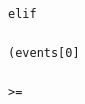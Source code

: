 \documentclass[10pt,a4paper]{article} %
\begin{document}
\begin{lstlisting}
                                                                                                                                                                                                                                                                                                                                                                                                                                                                                                                                                                                                                                                                                                                                                                                                                                                                                                                                                                                                                                                                                                    elif
                                                                                                                                                                                                                                                                                                                                                                                                                                                                                                                                                                                                                                                                                                                                                                                                                                                                                                                                                                                                                                                                                                    (events[0]
                                                                                                                                                                                                                                                                                                                                                                                                                                                                                                                                                                                                                                                                                                                                                                                                                                                                                                                                                                                                                                                                                                    >=

\end{lstlisting}
\end{document}
